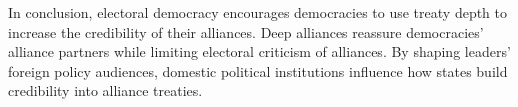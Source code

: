 \documentclass[12pt]{article}
\begin{document}
In conclusion, electoral democracy encourages democracies to use treaty depth to increase the credibility of their alliances. 
Deep alliances reassure democracies' alliance partners while limiting electoral criticism of alliances. 
By shaping leaders' foreign policy audiences, domestic political institutions influence how states build credibility into alliance treaties.




 
 
\end{document}
